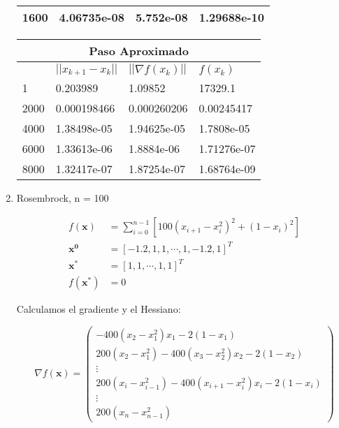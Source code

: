 \documentclass{article}
\begin{document}
\begin{enumerate}
\begin{table}[ht]
{\begin{tabular}{llll}
  \multicolumn{1}{|l|}{1600}  & \multicolumn{1}{l|}{4.06735e-08}  & \multicolumn{1}{l|}{5.752e-08}  & \multicolumn{1}{l|}{1.29688e-10} \\ \hline
  \end{tabular}
  \begin{tabular}{llll}
  \multicolumn{4}{c}{Paso Aproximado} \\ \hline
  \rowcolor[HTML]{DBDBDB} 
  \multicolumn{1}{|l|}{\cellcolor[HTML]{DBDBDB}k} & \multicolumn{1}{l|}{\cellcolor[HTML]{DBDBDB}$||x_{k+1} - x_k||$} & \multicolumn{1}{l|}{\cellcolor[HTML]{DBDBDB}$||\nabla f (x_k )||$}       & \multicolumn{1}{l|}{\cellcolor[HTML]{DBDBDB}$f(x_k)$} \\ \hline
\multicolumn{1}{|l|}{1} & \multicolumn{1}{l|}{0.203989} & \multicolumn{1}{l|}{1.09852}  &\multicolumn{1}{l|}{17329.1} \\ \hline
\multicolumn{1}{|l|}{2000}  & \multicolumn{1}{l|}{0.000198466}  & \multicolumn{1}{l|}{0.000260206}  & \multicolumn{1}{l|}{0.00245417} \\ \hline
\multicolumn{1}{|l|}{4000}  & \multicolumn{1}{l|}{1.38498e-05}  & \multicolumn{1}{l|}{1.94625e-05}  & \multicolumn{1}{l|}{1.7808e-05} \\ \hline
\multicolumn{1}{|l|}{6000}  & \multicolumn{1}{l|}{1.33613e-06}  & \multicolumn{1}{l|}{1.8884e-06} & \multicolumn{1}{l|}{1.71276e-07} \\ \hline
\multicolumn{1}{|l|}{8000}  & \multicolumn{1}{l|}{1.32417e-07}  & \multicolumn{1}{l|}{1.87254e-07}  & \multicolumn{1}{l|}{1.68764e-09} \\ \hline
  \end{tabular}
}
\end{table}

\newpage
\item Rosembrock, n = 100

\begin{align*} 
f(\boldsymbol{x}) &= \sum_{i=0}^{n-1}[100 (x_{i+1} - x_i^2)^2 + (1 - x_i)^2] \\
\boldsymbol{x^0} &= [-1.2, 1, 1, \cdots, 1, -1.2, 1]^T \\
\boldsymbol{x^*} &= [1, 1, \cdots, 1, 1]^T \\
f(\boldsymbol{x^*}) &= 0
\end{align*}

Calculamos el gradiente y el Hessiano:

$$\nabla f(\boldsymbol{x}) = 
 \begin{pmatrix}
  -400(x_2 - x_1^2)x_1 - 2(1 - x_1) \\
  200(x_2 - x_1^2) - 400(x_3 - x_2^2)x_2 - 2(1 - x_2)\\
  \vdots\\
  200(x_{i} - x_{i-1}^2) - 400(x_{i+1} - x_i^2)x_i - 2(1 - x_i)\\
  \vdots\\
  200(x_{n} - x_{n-1}^2)
 \end{pmatrix}$$


\end{enumerate}
\end{document}
